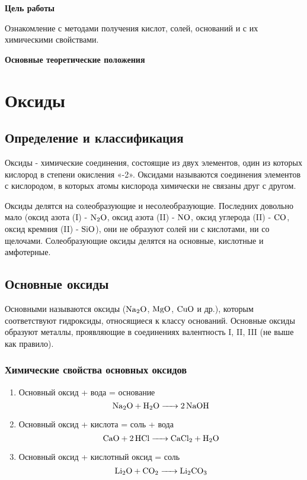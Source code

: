 \large
\textbf{Цель работы}

Ознакомление с методами получения кислот, солей, оснований и с их
химическими свойствами.

\begin{center}
    \large
    \textbf{Основные теоретические положения}
\end{center}

\section{Оксиды}%
\label{sec:Оксиды}

\subsection{Определение и классификация}
Оксиды - химические соединения, состоящие из двух элементов, один из
которых кислород в степени окисления «-2». Оксидами называются соединения
элементов с кислородом, в которых атомы кислорода химически не связаны друг с
другом.

Оксиды делятся на солеобразующие и несолеобразующие. Последних довольно
мало (оксид азота (I) - $\ce{N2O}$, оксид азота (II) - $\ce{NO}$, оксид углерода (II) - $\ce{CO}$, оксид
кремния (II) - $\ce{SiO}$), они не образуют солей ни с кислотами, ни со щелочами.
Солеобразующие оксиды делятся на основные, кислотные и амфотерные.
\\

\subsection{Основные оксиды}

Основными называются оксиды ($\ce{Na2O}$, $\ce{MgO}$, $\ce{CuO}$ и др.), которым
соответствуют гидроксиды, относящиеся к классу оснований. Основные оксиды
образуют металлы, проявляющие в соединениях валентность I, II, III (не выше как
правило).

\subsubsection{Химические свойства основных оксидов}

\begin{enumerate}
    \item Основный оксид + вода = основание
        $$\ce{Na2O + H2O -> 2NaOH}$$

    \item Основный оксид + кислота = соль + вода
        $$\ce{CaO + 2HCl -> CaCl2 + H2O}$$

    \item Основный оксид + кислотный оксид = соль
        $$\ce{Li2O + CO2 -> Li2CO3}$$
\end{enumerate}

